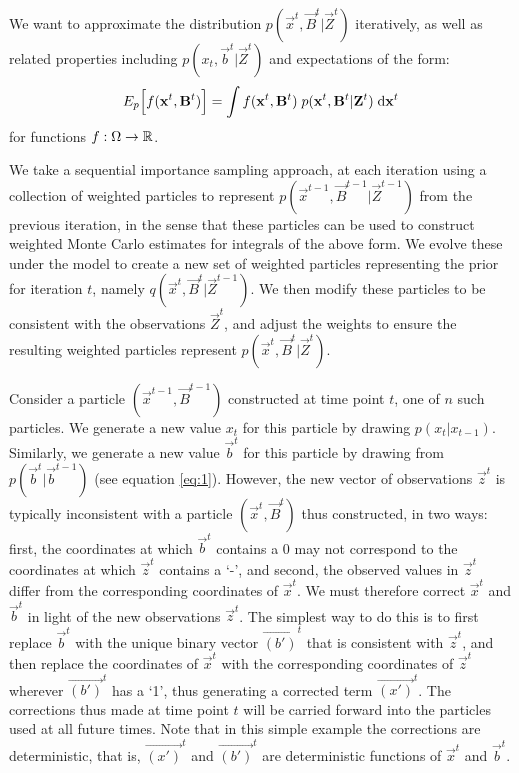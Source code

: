 We want to approximate the distribution $p(\vec{x}^{t}, \vec{B}^{t} | \vec{Z}^{t})$ iteratively, as well as related properties including   $p(x_{t}, \vec{b}^{t} | \vec{Z}^{t})$ and expectations of the form:
\[
E_{p} \Big[f(\mathbf{x}^{t}, \mathbf{B}^{t}) \Big] = \int f(\mathbf{x}^{t}, \mathbf{B}^{t})\; p(\mathbf{x}^{t}, \mathbf{B}^{t} | \mathbf{Z}^{t})\; \mathrm{d} \mathbf{x}^{t}
\]
for functions $f: \Omega  \rightarrow \mathbb R$. 

We take a sequential importance sampling approach, at each iteration using a collection of weighted particles to represent $p(\vec{x}^{t-1}, \vec{B}^{t-1} | \vec{Z}^{t-1})$ from the previous iteration, in the sense that these particles can be used to construct weighted Monte Carlo estimates for integrals of the above form. We evolve these under the model to create a new set of weighted particles representing the prior for iteration $t$, namely $q(\vec{x}^{t}, \vec{B}^{t} | \vec{Z}^{t-1})$. We then modify these particles to be consistent with the observations $\vec{Z}^{t}$, and adjust the weights to ensure the resulting weighted particles represent $p(\vec{x}^{t}, \vec{B}^{t} | \vec{Z}^{t})$.

Consider a particle $(\vec{x}^{t-1},\vec{B}^{t-1})$ constructed at time point $t$, one of $n$ such particles. We generate a new value $x_t$ for this particle by drawing $p(x_t | x_{t-1})$. Similarly, we generate a new value $\vec{b}^{t}$ for this particle by drawing from $p(\vec{b}^{t} | \vec{b}^{t-1})$ (see equation \eqref{eq:1}). However, the new vector of observations $\vec{z}^{t}$ is typically inconsistent with a particle $(\vec{x}^{t}, \vec{B}^{t})$ thus constructed, in two ways: first, the coordinates at which $\vec{b}^{t}$ contains a 0 may not correspond to the coordinates at which $\vec{z}^{t}$ contains a `-', and second, the observed values in $\vec{z}^{t}$ differ from the corresponding coordinates of $\vec{x}^{t}$. We must therefore correct $\vec{x}^{t}$ and $\vec{b}^{t}$ in light of the new observations $\vec{z}^{t}$. The simplest way to do this is to first replace $\vec{b}^{t}$ with the unique binary vector $\vec{(b')}^{t}$ that is consistent with $\vec{z}^{t}$, and then replace the coordinates of $\vec{x}^{t}$ with the corresponding coordinates of $\vec{z}^{t}$ wherever $\vec{(b')}^{t}$ has a `1', thus generating a corrected term $\vec{(x')}^{t}$. The corrections thus made at time point $t$ will be carried forward into the particles used at all future times. Note that in this simple example the corrections are deterministic, that is, $\vec{(x')}^{t}$ and $\vec{(b')}^{t}$ are deterministic functions of $\vec{x}^{t}$ and $\vec{b}^{t}$. 

